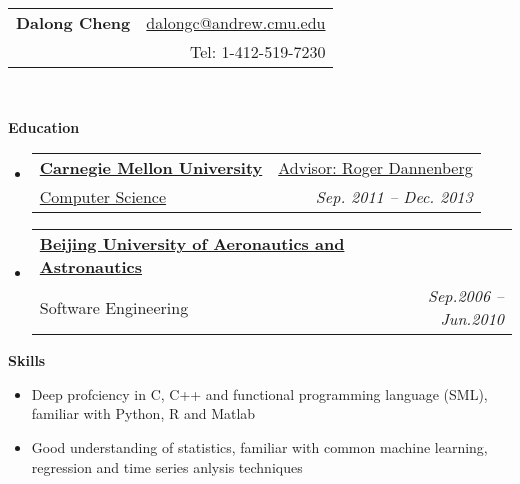 \documentclass[letterpaper,11pt]{article}
\makeatletter
\newcommand{\resheading}[1]{{\large \colorbox{mygrey}{\begin{minipage}{\textwidth}{\textbf{#1 \vphantom{p\^{E}}}}\end{minipage}}}}
\newcommand{\ressubheading}[4]{
\begin{tabular*}{6.5in}{l@{\extracolsep{\fill}}r}
		\textbf{#1} & #2 \\
		{#3}{} & \textit{#4} \\
\end{tabular*}\vspace{-6pt}}
\makeatother
\begin{document}
\newcommand{\mywebheader}{
\begin{tabular*}{7in}{l@{\extracolsep{\fill}}r}
	\textbf{\LARGE Dalong Cheng} & \href{mailto:dalongc@andrew.cmu.edu}{dalongc@andrew.cmu.edu}\\
	{\footnotesize \texttt{}} & {Tel: 1-412-519-7230} \\
	\end{tabular*}
\\
\vspace{0.1in}}

\mywebheader

\resheading{Education}
  \begin{itemize}
		\item
      \ressubheading{\href{http://www.cmu.edu}
      {Carnegie Mellon University}}
      {\href{http://www.cs.cmu.edu/\~rbd}{Advisor: Roger Dannenberg}} 
      {\href{http://www.cs.cmu.edu/~music/mat/}{Computer Science}{}}
      {Sep. 2011 -- Dec. 2013}

    \item	
      \ressubheading{\href{http://ev.buaa.edu.cn}
      {Beijing University of Aeronautics and Astronautics}}
      {}{Software Engineering}{Sep.2006 -- Jun.2010}

	\end{itemize}

\resheading{{Skills}}
  \begin{itemize}
		\item{\small Deep profciency in C, C++ and 
    functional programming language (SML), familiar with Python, R and Matlab}

		\item{\small Good understanding of statistics, familiar with 
    common machine learning, regression and time series anlysis techniques}
	\end{itemize}
\end{document}
